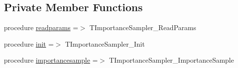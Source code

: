 \subsection*{Private Member Functions}
\begin{DoxyCompactItemize}
\item 
procedure \mbox{\hyperlink{structimportancesampling_1_1timportancesampler_a268b0ac5bdba201170d4e08abf9308f3}{readparams}} =$>$ T\+Importance\+Sampler\+\_\+\+Read\+Params
\item 
procedure \mbox{\hyperlink{structimportancesampling_1_1timportancesampler_a75f7f0a6088d1c1038abb066339625fb}{init}} =$>$ T\+Importance\+Sampler\+\_\+\+Init
\item 
procedure \mbox{\hyperlink{structimportancesampling_1_1timportancesampler_aa53cd8f18fcfcca8033c75840ec6cba6}{importancesample}} =$>$ T\+Importance\+Sampler\+\_\+\+Importance\+Sample
\end{DoxyCompactItemize}
